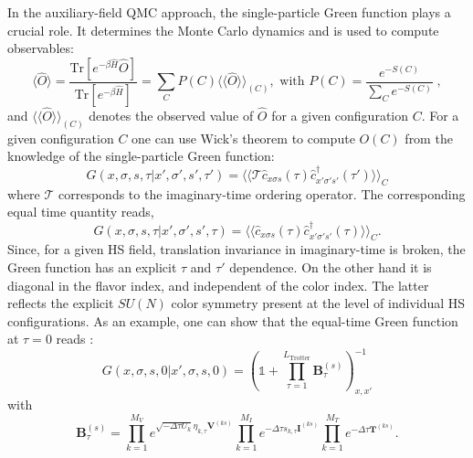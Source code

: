 In the auxiliary-field QMC approach, the single-particle Green function plays a crucial role.  It determines the Monte Carlo dynamics and is used to compute  observables:
\begin{equation}\label{eqn:obs}
\langle \hat{O}  \rangle  = \frac{ \text{Tr}   \left[ e^{- \beta \hat{H}}  \hat{O}   \right] }{ \text{Tr}   \left[ e^{- \beta \hat{H}}  \right] } =   \sum_{C}   P(C) 
   \langle \langle \hat{O}  \rangle \rangle_{(C)} , \text{   with   } 
  P(C)   = \frac{ e^{-S(C)}}{\sum_C e^{-S(C)}}\;,
\end{equation}
and $\langle \langle \hat{O}  \rangle \rangle_{(C)} $ denotes the observed value of $\hat{O}$ for a given configuration $C$.
For a given configuration $C$  one can use Wick's theorem to compute $O (C) $   from the knowledge of the single-particle Green function: 
\begin{equation}
       G( x,\sigma,s, \tau |    x',\sigma',s', \tau')   =       \langle \langle \mathcal{T} \hat{c}^{\phantom\dagger}_{x \sigma s} (\tau)  \hat{c}^{\dagger}_{x' \sigma' s'} (\tau') \rangle \rangle_{C}
\end{equation}
where $ \mathcal{T} $ corresponds to the imaginary-time ordering operator.   The  corresponding equal time quantity reads, 
\begin{equation}
       G( x,\sigma,s, \tau |    x',\sigma',s', \tau)   =       \langle \langle  \hat{c}^{\phantom\dagger}_{x \sigma s} (\tau)  \hat{c}^{\dagger}_{x' \sigma' s'} (\tau) \rangle \rangle_{C}.
\end{equation}
Since, for a given HS field, translation invariance in imaginary-time is broken, the Green function has an explicit $\tau$ and $\tau'$ dependence.   On the other hand it is diagonal in the flavor index, and independent of the color index. The latter reflects the  explicit $SU(N)$   color symmetry present at the level of individual HS configurations.   As an example,  one can show that the equal-time Green function at $\tau = 0$ reads \cite{Assaad08_rev}:
\begin{equation}\label{eqn:Green_eq}
G(x,\sigma,s,0| x',\sigma,s,0 )  =   \left(  \mathds{1}  +  \prod_{\tau = 1}^{L_{\text{Trotter}}}  \bm{B}_{\tau}^{(s)}   \right)^{-1}_{x,x'}
\end{equation}
with
\begin{equation}
\label{Btau.eq}
	\bm{B}_{\tau}^{(s)} =   
    \prod_{k=1}^{M_V}   e^{  \sqrt{ -\Delta \tau  U_k} \eta_{k,\tau} {\bm V}^{(ks)} }   \prod_{k=1}^{M_I}   e^{  -\Delta \tau s_{k,\tau}  {\bm I}^{(ks)}}
    \prod_{k=1}^{M_T}   e^{-\Delta \tau {\bm T}^{(ks)}} .
\end{equation}


